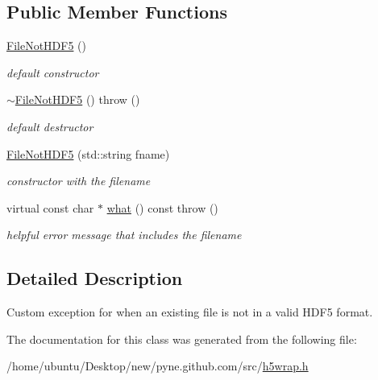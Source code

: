 \subsection*{Public Member Functions}
\begin{DoxyCompactItemize}
\item 
\hyperlink{classh5wrap_1_1_file_not_h_d_f5_a3fa40cb39abaa241e80ee97a13e69815}{File\+Not\+H\+D\+F5} ()\hypertarget{classh5wrap_1_1_file_not_h_d_f5_a3fa40cb39abaa241e80ee97a13e69815}{}\label{classh5wrap_1_1_file_not_h_d_f5_a3fa40cb39abaa241e80ee97a13e69815}

\begin{DoxyCompactList}\small\item\em default constructor \end{DoxyCompactList}\item 
\hyperlink{classh5wrap_1_1_file_not_h_d_f5_a55276b2bc97da82f25a0718327b00742}{$\sim$\+File\+Not\+H\+D\+F5} ()  throw ()\hypertarget{classh5wrap_1_1_file_not_h_d_f5_a55276b2bc97da82f25a0718327b00742}{}\label{classh5wrap_1_1_file_not_h_d_f5_a55276b2bc97da82f25a0718327b00742}

\begin{DoxyCompactList}\small\item\em default destructor \end{DoxyCompactList}\item 
\hyperlink{classh5wrap_1_1_file_not_h_d_f5_ac6f9e6588f3a55f26fe6cd13ab75425b}{File\+Not\+H\+D\+F5} (std\+::string fname)\hypertarget{classh5wrap_1_1_file_not_h_d_f5_ac6f9e6588f3a55f26fe6cd13ab75425b}{}\label{classh5wrap_1_1_file_not_h_d_f5_ac6f9e6588f3a55f26fe6cd13ab75425b}

\begin{DoxyCompactList}\small\item\em constructor with the filename \end{DoxyCompactList}\item 
virtual const char $\ast$ \hyperlink{classh5wrap_1_1_file_not_h_d_f5_afce2273e3c8d54802598bdc30cdedec2}{what} () const   throw ()\hypertarget{classh5wrap_1_1_file_not_h_d_f5_afce2273e3c8d54802598bdc30cdedec2}{}\label{classh5wrap_1_1_file_not_h_d_f5_afce2273e3c8d54802598bdc30cdedec2}

\begin{DoxyCompactList}\small\item\em helpful error message that includes the filename \end{DoxyCompactList}\end{DoxyCompactItemize}


\subsection{Detailed Description}
Custom exception for when an existing file is not in a valid H\+D\+F5 format. 

The documentation for this class was generated from the following file\+:\begin{DoxyCompactItemize}
\item 
/home/ubuntu/\+Desktop/new/pyne.\+github.\+com/src/\hyperlink{h5wrap_8h}{h5wrap.\+h}\end{DoxyCompactItemize}

